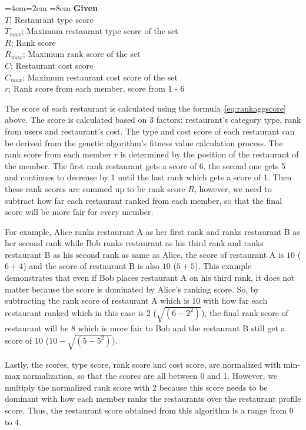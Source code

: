 \documentclass[12pt,oneside,openright,a4paper]{cpe-english-project}
\newenvironment{blockquote}{%
  \par%
  \medskip
  \leftskip=4em\rightskip=2em%
  \noindent\ignorespaces}{%
  \par\medskip}
\begin{document}
\begin{blockquote}\leftskip=8em
\textbf{Given}\\
$T$; Restaurant type score\\
$T_{max}$; Maximum restaurant type score of the set\\
$R$; Rank score\\
$R_{max}$; Maximum rank score of the set\\
$C$; Restaurant cost score\\
$C_{max}$; Maximum restaurant cost score of the set\\
$r$; Rank score from each member, score from 1 - 6
\end{blockquote}

The score of each restaurant is calculated using the formula~\ref{eq:rankaggscore} above. The score is calculated based on 3 factors: restaurant’s category type, rank from users and restaurant’s cost. The type and cost score of each restaurant can be derived from the genetic algorithm’s fitness value calculation process. The rank score from each member $r$ is determined by the position of the restaurant of the member. The first rank restaurant gets a score of 6, the second one gets 5 and continues to decrease by 1 until the last rank which gets a score of 1. Then these rank scores are summed up to be rank score $R$, however, we need to subtract how far each restaurant ranked from each member, so that the final score will be more fair for every member.

For example, Alice ranks restaurant A as her first rank and ranks restaurant B as her second rank while Bob ranks restaurant as his third rank and ranks restaurant B as his second rank as same as Alice, the score of restaurant A is $10$ ($6 + 4$) and the score of restaurant B is also $10$ ($5 + 5$). This example demonstrates that even if Bob places restaurant A on his third rank, it does not matter because the score is dominated by Alice's ranking score. So, by subtracting the rank score of restaurant A which is $10$ with how far each restaurant ranked which in this case is $2$ ($\sqrt{(6-2^2)}$), the final rank score of restaurant will be 8 which is more fair to Bob and the restaurant B still get a score of $10$ ($10-\sqrt{(5-5^2)}$).

Lastly, the scores, type score, rank score and cost score, are normalized with min-max normalization, so that the scores are all between 0 and 1. However, we multiply the normalized rank score with 2 because this score needs to be dominant with how each member ranks the restaurants over the restaurant profile score. Thus, the restaurant score obtained from this algorithm is a range from 0 to 4.
\end{document}
